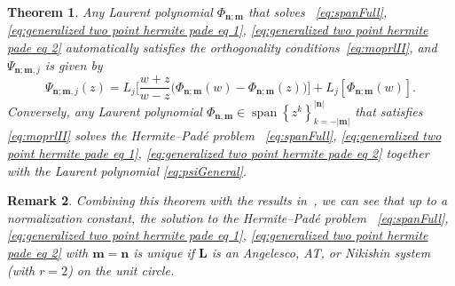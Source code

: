 \documentclass[reqno,centertags,11pt,draft]{amsart}
\newtheorem{thm}{Theorem}[section]
\newtheorem{rem}[thm]{Remark}
\newcommand{\abs}[1]{\left|#1\right|}
\newcommand{\set}[1]{\left\{#1\right\}}
\begin{document}
\begin{thm}\label{thm:generalized hermite pade orthogonality}
    Any Laurent polynomial $\Phi_{\bm{n};\bm{m}}$ that solves ~\eqref{eq:spanFull}, \eqref{eq:generalized two point hermite pade eq 1}, \eqref{eq:generalized two point hermite pade eq 2} 
    automatically satisfies the orthogonality conditions~\eqref{eq:moprlII},
    and $\Psi_{\bm{n};\bm{m},j}$ is given by
    \begin{equation}\label{eq:psiGeneral}
        \Psi_{\bm{n};\bm{m},j}(z) = L_j\Big[\frac{w+z}{w-z}\big(\Phi_{\bm{n};\bm{m}}(w) - \Phi_{\bm{n};\bm{m}}(z)\big)\Big] + L_j[\Phi_{\bm{n};\bm{m}}(w)].
   \end{equation}
   Conversely, any Laurent polynomial $\Phi_{\bm{n},\bm{m}} \in \operatorname{span}\set{z^k}_{k = -\abs{\bm{m}}}^{\abs{\bm{n}}}$ that satisfies \eqref{eq:moprlII} solves the Hermite--Pad\'e problem ~\eqref{eq:spanFull}, \eqref{eq:generalized two point hermite pade eq 1}, \eqref{eq:generalized two point hermite pade eq 2}  together with the Laurent polynomial \eqref{eq:psiGeneral}.
\end{thm}
\begin{rem}
    Combining this theorem with the results in~\cite{KVMLOPUC1,KNik}, we can see that up to a normalization constant, the solution to the Hermite--Pad\'{e} problem ~\eqref{eq:spanFull}, \eqref{eq:generalized two point hermite pade eq 1}, \eqref{eq:generalized two point hermite pade eq 2}  with $\bm{m}=\bm{n}$ is unique if $\bm{L}$ is an Angelesco, AT, or Nikishin system (with $r=2$) on the unit circle.
\end{rem}
\end{document}
